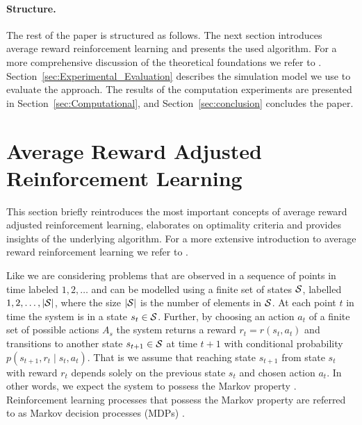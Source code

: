 \documentclass[envcountsame]{llncs}
\newcommand\MS[2][r]{\ifx t#1 \textcolor{blue}{[\textbf{MS:} #2]}
  \else \begin{center}\textcolor{blue}{\textbf{MS:} #2} \end{center} \fi}
\begin{document}
\paragraph{Structure.} The rest of the paper is structured as follows. The next section introduces
average reward reinforcement learning and presents the used algorithm. For a more comprehensive
discussion of the theoretical foundations we refer to \citet{schneckenreither2020average}.
Section~\ref{sec:Experimental_Evaluation} describes the simulation model we use to evaluate the
approach. The results of the computation experiments are presented in
Section~\ref{sec:Computational}, and Section~\ref{sec:conclusion} concludes the paper.



\section{Average Reward Adjusted Reinforcement Learning}

This section briefly reintroduces the most important concepts of average reward adjusted
reinforcement learning, elaborates on optimality criteria and provides insights of the underlying
algorithm. For a more extensive introduction to average reward reinforcement learning we refer to
\citet{schneckenreither2020average}.

Like \cite{MillerVeinott1969} we are considering problems that are observed in a sequence of points
in time labeled \(1,2,\ldots\) and can be modelled using a finite set of states \(\mathcal{S}\),
labelled \(1,2,\ldots,\lvert{\mathcal{S}}\rvert\), where the size \(\lvert{\mathcal{S}}\rvert\) is the number of elements
in \(\mathcal{S}\). At each point $t$ in time the system is in a state \(s_{t} \in \mathcal{S}\). Further,
by choosing an action $a_{t}$ of a finite set of possible actions \(A_{s}\) the system returns a
reward $r_{t} = r(s_{t}, a_{t})$ and transitions to another state \(s_{t+1} \in \mathcal{S}\) at time
\(t+1\) with conditional probability \(p(s_{t+1}, r_{t} \mid s_{t}, a_{t})\). That is we assume that
reaching state \(s_{t+1}\) from state \(s_{t}\) with reward \(r_{t}\) depends solely on the previous
state \(s_{t}\) and chosen action \(a_{t}\). In other words, we expect the system to possess the
Markov property \citep[p.63]{sutton1998introduction}. Reinforcement learning processes that possess
the Markov property are referred to as Markov decision processes (MDPs)
\citep[p.66]{sutton1998introduction}.
\end{document}
